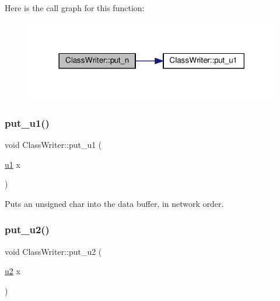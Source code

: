 Here is the call graph for this function\+:
\nopagebreak
\begin{figure}[H]
\begin{center}
\leavevmode
\includegraphics[width=318pt]{classClassWriter_aa527b917e9f3628ceaeccb95d30bfbb9_cgraph}
\end{center}
\end{figure}
\mbox{\label{classClassWriter_a07332eb8e8e5ead72834e286cf8a6bd4}} 
\subsubsection{\texorpdfstring{put\+\_\+u1()}{put\_u1()}}
{\footnotesize\ttfamily void Class\+Writer\+::put\+\_\+u1 (\begin{DoxyParamCaption}\item[{\hyperlink{types_8h_a162f47a77ee24f6f77cd8c82ccd40ab7}{u1}}]{x }\end{DoxyParamCaption})\hspace{0.3cm}{\ttfamily [private]}}



Puts an unsigned char into the data buffer, in network order. 

\mbox{\label{classClassWriter_a0304019dd68dd830fac5c67971ed2070}} 
\subsubsection{\texorpdfstring{put\+\_\+u2()}{put\_u2()}}
{\footnotesize\ttfamily void Class\+Writer\+::put\+\_\+u2 (\begin{DoxyParamCaption}\item[{\hyperlink{types_8h_ae676e9207f57fb921dca7366b2f59c53}{u2}}]{x }\end{DoxyParamCaption})\hspace{0.3cm}{\ttfamily [private]}}



